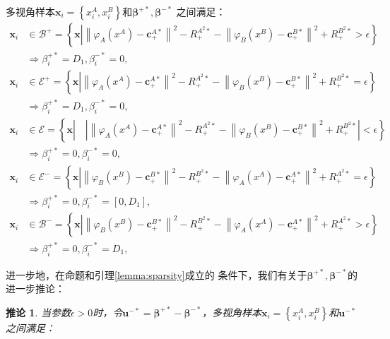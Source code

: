 \documentclass[twoside,zihao=-4,UTF8]{bjfu}
\begin{document}
\begin{lemma}[$\boldsymbol{\pi}$的稀
	疏性]
多视角样本$\boldsymbol{x}_{i} 
=\left\{x_{i}^{A},x_{i}^{B}\right\}$和$\boldsymbol{\beta}^{+*},\boldsymbol{\beta}^{-*}$
之间满足：
\begin{align}
	\boldsymbol{x}_{i} & \in \mathcal{B}^{+} = \left\{\boldsymbol{x} \left| 
	{{\left\| 
	{{\varphi }_{A}}( x^{A})-\boldsymbol{c}_{+}^{A*} 
	\right\|}^{2}}-R_{+}^{{{A}^{2}*}} - {{\left\|{{\varphi }_{B}}( x^{B} 
	)-\boldsymbol{c}_{+}^{B*} \right\|}^{2}}+R_{+}^{{{B}^{2}*}}  > \epsilon  
	\right. 
	\right\} \nonumber \\ 
	& \Rightarrow \beta_{i}^{+*} = D_{1},\beta_{i}^{-*} = 0, \\
	\boldsymbol{x}_{i} & \in \mathcal{E}^{+} = \left\{\boldsymbol{x} \left| 
	{{\left\| 
			{{\varphi }_{A}}( x^{A})-\boldsymbol{c}_{+}^{A*} 
			\right\|}^{2}}-R_{+}^{{{A}^{2}*}} - {{\left\|{{\varphi }_{B}}( 
			x^{B} 
			)-\boldsymbol{c}_{+}^{B*} \right\|}^{2}}+R_{+}^{{{B}^{2}*}}  = 
			\epsilon  
	\right. 
	\right\} \nonumber \\ 
	& \Rightarrow \beta_{i}^{+*} = D_{1},\beta_{i}^{-*} = 0, \\
	\boldsymbol{x}_{i} & \in \mathcal{E} = \left\{\boldsymbol{x} \left| 
	\quad
	\left|
	{{\left\| 
			{{\varphi }_{A}}( x^{A})-\boldsymbol{c}_{+}^{A*} 
			\right\|}^{2}}-R_{+}^{{{A}^{2}*}} - {{\left\|{{\varphi }_{B}}( 
			x^{B} 
			)-\boldsymbol{c}_{+}^{B*} \right\|}^{2}}+R_{+}^{{{B}^{2}*}} \right|  
			< \epsilon  
	\right. 
	\right\} \nonumber \\ 
	& \Rightarrow \beta_{i}^{+*} =0,\beta_{i}^{-*} = 0, \\
	\boldsymbol{x}_{i} & \in \mathcal{E}^{-} = \left\{\boldsymbol{x} \left| 
	{{\left\| {{\varphi }_{B}}( x^{B})-\boldsymbol{c}_{+}^{B*} 
	\right\|}^{2}}-R_{+}^{{{B}^{2}*}} - {{\left\|{{\varphi }_{A}}( 
	x^{A} )-\boldsymbol{c}_{+}^{A*} \right\|}^{2}}+R_{+}^{{{A}^{2}*}} = 
	\epsilon  
	\right. 
	\right\} \nonumber \\ 
	& \Rightarrow \beta_{i}^{+*} = 0,\beta_{i}^{-*} = \left[0, D_{1}\right], \\
	\boldsymbol{x}_{i} & \in \mathcal{B}^{-} = \left\{\boldsymbol{x} \left| 
	{{\left\| {{\varphi }_{B}}( x^{B})-\boldsymbol{c}_{+}^{B*} 
			\right\|}^{2}}-R_{+}^{{{B}^{2}*}} - {{\left\|{{\varphi }_{A}}( 
			x^{A} )-\boldsymbol{c}_{+}^{A*} \right\|}^{2}}+R_{+}^{{{A}^{2}*}} 
			> 
	\epsilon  
	\right. 
	\right\} \nonumber \\ 
	& \Rightarrow \beta_{i}^{+*} = 0,\beta_{i}^{-*} = D_{1}, 
\end{align}
\end{lemma}
进一步地，在{\heiti 命题}和{\heiti 引理}\ref{lemma:sparsity}成立的
条件下，我们有关于$\boldsymbol{\beta}^{+*},\boldsymbol{\beta}^{-*}$的进一步推论：
\newtheorem{corollary}{推论}
\begin{corollary}
	当参数$\epsilon>0$时，令$\boldsymbol{u}^{-*} = 
	\boldsymbol{\beta}^{+*} - 
	\boldsymbol{\beta}^{-*}$，多视角样本$\boldsymbol{x}_{i} 
	=\left\{x_{i}^{A},x_{i}^{B}\right\}$和$\boldsymbol{u}^{-*}$
	之间满足：
\end{corollary}
\end{document}
